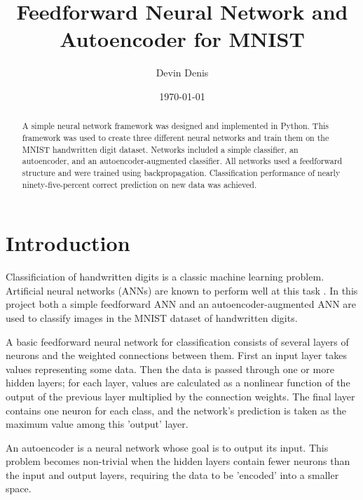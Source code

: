 \documentclass[english]{tktltiki}
\begin{document}
\onehalfspacing

\title{Feedforward Neural Network and Autoencoder for MNIST}
\author{Devin Denis}
\date{\today}

\maketitle



\begin{abstract}

A simple neural network framework was designed and implemented in Python.  This framework was used to create three different neural networks and train them on the MNIST handwritten digit dataset.  Networks included a simple classifier, an autoencoder, and an autoencoder-augmented classifier.  All networks used a feedforward structure and were trained using backpropagation.  Classification performance of nearly ninety-five-percent correct prediction on new data was achieved.

\end{abstract}

\mytableofcontents

\section{Introduction}
\label{sec:Introduction}

Classificiation of handwritten digits is a classic machine learning problem.  Artificial neural networks (ANNs) are known to perform well at this task \cite{MNIST}.  In this project both a simple feedforward ANN and an autoencoder-augmented ANN are used to classify images in the MNIST dataset of handwritten digits.

A basic feedforward neural network for classification consists of several layers of neurons and the weighted connections between them.  First an input layer takes values representing some data.  Then the data is passed through one or more hidden layers; for each layer, values are calculated as a nonlinear function of the output of the previous layer multiplied by the connection weights.  The final layer contains one neuron for each class, and the network's prediction is taken as the maximum value among this 'output' layer.

An autoencoder is a neural network whose goal is to output its input.  This problem becomes non-trivial when the hidden layers contain fewer neurons than the input and output layers, requiring the data to be 'encoded' into a smaller space.  
\end{document}
